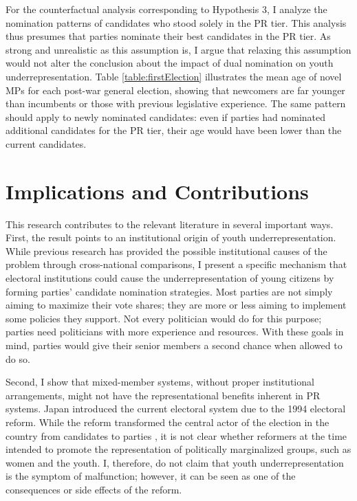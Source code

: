 \documentclass[a4paper, 12pt]{article}
\begin{document}
For the counterfactual analysis corresponding to Hypothesis 3, I analyze the nomination patterns of candidates who stood solely in the PR tier. This analysis thus presumes that parties nominate their best candidates in the PR tier. As strong and unrealistic as this assumption is, I argue that relaxing this assumption would not alter the conclusion about the impact of dual nomination on youth underrepresentation. Table \ref{table:firstElection} illustrates the mean age of novel MPs for each post-war general election, showing that newcomers are far younger than incumbents or those with previous legislative experience. The same pattern should apply to newly nominated candidates: even if parties had nominated additional candidates for the PR tier, their age would have been lower than the current candidates. 



\section{Implications and Contributions}

This research contributes to the relevant literature in several important ways. First, the result points to an institutional origin of youth underrepresentation. While previous research has provided the possible institutional causes of the problem through cross-national comparisons, I present a specific mechanism that electoral institutions could cause the underrepresentation of young citizens by forming parties' candidate nomination strategies. Most parties are not simply aiming to maximize their vote shares; they are more or less aiming to implement some policies they support. Not every politician would do for this purpose; parties need politicians with more experience and resources. With these goals in mind, parties would give their senior members a second chance when allowed to do so. 

Second, I show that mixed-member systems, without proper institutional arrangements, might not have the representational benefits inherent in PR systems. Japan introduced the current electoral system due to the 1994 electoral reform. While the reform transformed the central actor of the election in the country from candidates to parties \citep{catalinac_electoral_2016, shugart_causes_2003, shugart_consequences_2003}, it is not clear whether reformers at the time intended to promote the representation of politically marginalized groups, such as women and the youth. I, therefore, do not claim that youth underrepresentation is the symptom of malfunction; however, it can be seen as one of the consequences or side effects of the reform. 
\end{document}
